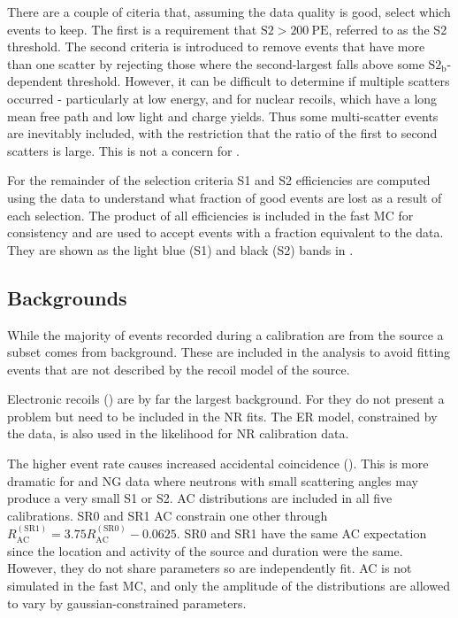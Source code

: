 There are a couple of citeria that, assuming the data quality is good, select which events to keep.  The first is a requirement that
$\mathrm{S2} > 200\ \mathrm{PE}$, referred to as the S2 threshold.  The second criteria is introduced to remove events that have more than
one scatter by rejecting those where the second-largest \stwob falls above some $\mathrm{S2_b}$-dependent threshold.  However, it can be
difficult to determine if multiple scatters occurred - particularly at low energy, and for nuclear
recoils, which have a long mean free path and low light and charge yields.  Thus some multi-scatter events are inevitably included,
with the restriction that the ratio of the first to second scatters is large.  This is not a concern for .

For the remainder of the selection criteria S1 and S2 efficiencies are computed using the data to understand what fraction of good events
are lost as a result of each selection.  The product of all efficiencies is included in the fast MC for consistency and are used to
accept events with a fraction equivalent to the data.  They are shown as the light blue (S1) and
black (S2) bands in .



\subsection{Backgrounds}
\label{subsec:er_nr_calibrations_parameter_determ_additional_components}
While the majority of events recorded during a calibration are from the source a subset comes
from background.  These are included in the analysis to avoid fitting events that are not described by the recoil model of the source.

Electronic recoils () are by far the largest background.  For 
they do not present a problem but need to be included in the NR fits.  The ER model, constrained by the  data, is also used
in the likelihood for NR calibration data.

The higher event rate causes increased accidental coincidence ().  This is more dramatic
for \ambe and NG data where neutrons with small scattering angles may produce a very small S1 or S2.  AC distributions are included
in all five calibrations.  SR0 and SR1  AC constrain one other through
$R_{\mathrm{AC}}^{\mathrm{(SR1)}} = 3.75 R_{\mathrm{AC}}^{\mathrm{(SR0)}} - 0.0625$.  SR0 and SR1 \ambe
have the same AC expectation since the location and activity of the source and duration were the same.  However, they do not share
parameters so are independently fit.  AC is not
simulated in the fast MC, and only the amplitude of the distributions are allowed to vary by gaussian-constrained parameters.

